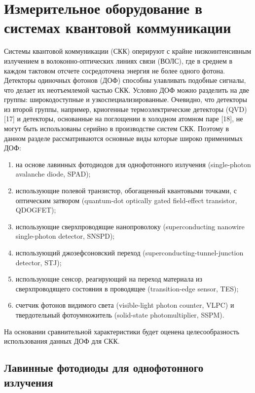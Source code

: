 
\section{Измерительное оборудование в системах квантовой коммуникации} \label{sec:ch1/sec5}


Системы квантовой коммуникации (СКК) оперируют с крайне низкоинтенсивным излучением в волоконно-оптических линиях связи (ВОЛС), где в среднем в каждом тактовом отсчете сосредоточена энергия не более одного фотона. Детекторы одиночных фотонов (ДОФ) способны улавливать подобные сигналы, что делает их неотъемлемой частью СКК. Условно ДОФ можно разделить на две группы: широкодоступные и узкоспециализированные. Очевидно, что детекторы из второй группы, например, криогенные термоэлектрические детекторы (QVD) [17] и детекторы, основанные на поглощении в холодном атомном паре [18], не могут быть использованы серийно в производстве систем СКК. Поэтому в данном разделе рассматриваются основные виды которые широко применимых ДОФ:

\begin{enumerate}
	\item на основе лавинных фотодиодов для однофотонного излучения (single-photon avalanche diode, SPAD);
	\item использующие полевой транзистор, обогащенный квантовыми точками, с оптическим затвором (quantum-dot optically gated field-effect transistor, QDOGFET);
	\item использующие сверхпроводящие нанопроволоку (superconducting nanowire single-photon detector, SNSPD);
	\item использующий джозефсоновский переход (superconducting-tunnel-junction detector, STJ);
	\item использующие сенсор, реагирующий на переход материала из сверхпроводящего состояния в проводящее (transition-edge sensor, TES);
	\item счетчик фотонов видимого света (visible-light photon counter, VLPC) и твердотельный фотоумножитель (solid-state photomultiplier, SSPM).
\end{enumerate}

На основании сравнительной характеристики будет оценена целесообразность использования данных ДОФ для СКК.

\subsection{Лавинные фотодиоды для однофотонного излучения} \label{subsec:ch1/sec5/sub1}

